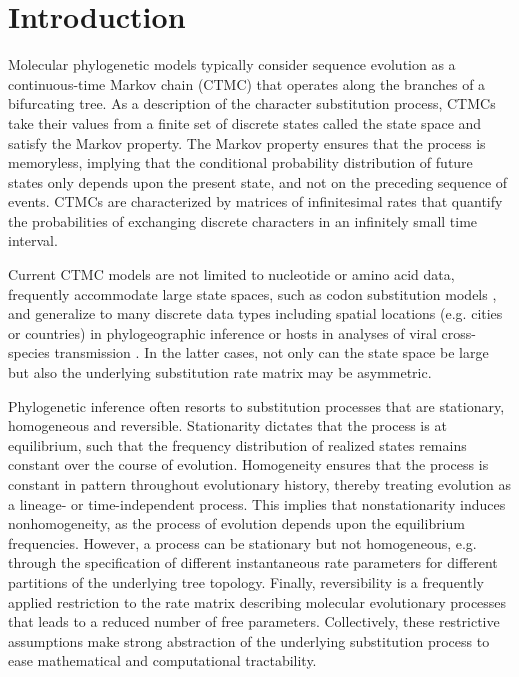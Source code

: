 \section{Introduction}

Molecular phylogenetic models typically consider sequence evolution as a continuous-time Markov chain (CTMC) that operates along the branches of a bifurcating tree.
As a description of the character substitution process, CTMCs take their values from a finite set of discrete states called the state space and satisfy the Markov property.
The Markov property ensures that the process is memoryless, implying that the conditional probability distribution of future states only depends upon the present state, and not on the preceding sequence of events.
CTMCs are characterized by matrices of infinitesimal rates that quantify the probabilities of exchanging discrete characters in an infinitely small time interval.

Current CTMC models are not limited to nucleotide or amino acid data, frequently accommodate large state spaces, such as codon substitution models \citep{Goldman1994, Muse1994}, and generalize to many discrete data types including spatial locations (e.g. cities or countries) in phylogeographic inference \citep{Lemey2009} or hosts in analyses of viral cross-species transmission \citep{Faria2013, Mather2013}.
In the latter cases, not only can the state space be large but also the underlying substitution rate matrix may be asymmetric.

Phylogenetic inference often resorts to substitution processes that are stationary, homogeneous and reversible.
Stationarity dictates that the process is at equilibrium, such that the frequency distribution of realized states remains constant over the course of evolution. 
Homogeneity ensures that the process is constant in pattern throughout evolutionary history, thereby treating evolution as a lineage- or time-independent process.
This implies that nonstationarity induces nonhomogeneity, as the process of evolution depends upon the equilibrium frequencies.
However, a process can be stationary but not homogeneous, e.g. through the specification of different instantaneous rate parameters for different partitions of the underlying tree topology.
Finally, reversibility is a frequently applied restriction to the rate matrix describing molecular evolutionary processes that leads to a reduced number of free parameters.
Collectively, these restrictive assumptions make strong abstraction of the underlying substitution process to ease mathematical and computational tractability.

